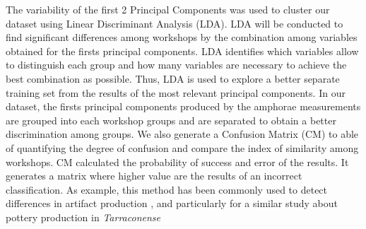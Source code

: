 \documentclass[review]{elsarticle}
\begin{document}
The variability of the first 2 Principal Components was used to cluster our dataset using Linear Discriminant Analysis (LDA). LDA will be conducted to find significant differences among workshops by the combination among variables obtained for the firsts principal components. LDA identifies which variables allow to distinguish each group and how many variables are necessary to achieve the best combination as possible. Thus, LDA is used to explore a better separate training set from the results of the most relevant principal components. In our dataset, the firsts principal components produced by the amphorae measurements are grouped into each workshop groups and are separated to obtain a better discrimination among groups. 
We also generate a Confusion Matrix (CM) to able of quantifying the degree of confusion and compare the index of similarity among workshops.  CM calculated the probability of success and error of the results. It generates a matrix where higher value are the results of an incorrect classification. As example, this method has been commonly used to detect differences in artifact production \citep{charlton_investigating_2012, thorpe_distribution_1984}, and particularly for a similar study about pottery production in \emph{Tarraconense} \citep{i_martin_alisis_1998}

\end{document}
